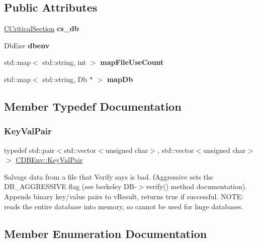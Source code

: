 \subsection*{Public Attributes}
\begin{DoxyCompactItemize}
\item 
\mbox{\label{class_c_d_b_env_af71bf28f9142c38aedc550353270b2b7}} 
\mbox{\hyperlink{class_annotated_mixin}{C\+Critical\+Section}} {\bfseries cs\+\_\+db}
\item 
\mbox{\label{class_c_d_b_env_a50a70690e7f688f5e92a972e7fa18668}} 
Db\+Env {\bfseries dbenv}
\item 
\mbox{\label{class_c_d_b_env_a3b8a3caf48395ef3f05e3717b33bf32c}} 
std\+::map$<$ std\+::string, int $>$ {\bfseries map\+File\+Use\+Count}
\item 
\mbox{\label{class_c_d_b_env_a89184b6635285b963fa4d80fc292b386}} 
std\+::map$<$ std\+::string, Db $\ast$ $>$ {\bfseries map\+Db}
\end{DoxyCompactItemize}


\subsection{Member Typedef Documentation}
\mbox{\label{class_c_d_b_env_a53fd285f09c312973caa6f90b33937f5}} 
\subsubsection{\texorpdfstring{KeyValPair}{KeyValPair}}
{\footnotesize\ttfamily typedef std\+::pair$<$std\+::vector$<$unsigned char$>$, std\+::vector$<$unsigned char$>$ $>$ \mbox{\hyperlink{class_c_d_b_env_a53fd285f09c312973caa6f90b33937f5}{C\+D\+B\+Env\+::\+Key\+Val\+Pair}}}

Salvage data from a file that Verify says is bad. f\+Aggressive sets the D\+B\+\_\+\+A\+G\+G\+R\+E\+S\+S\+I\+VE flag (see berkeley D\+B-\/$>$verify() method documentation). Appends binary key/value pairs to v\+Result, returns true if successful. N\+O\+TE\+: reads the entire database into memory, so cannot be used for huge databases. 

\subsection{Member Enumeration Documentation}
\mbox{\label{class_c_d_b_env_a6fbf26da5d7f8f64a77a3ba15e4df244}} 
